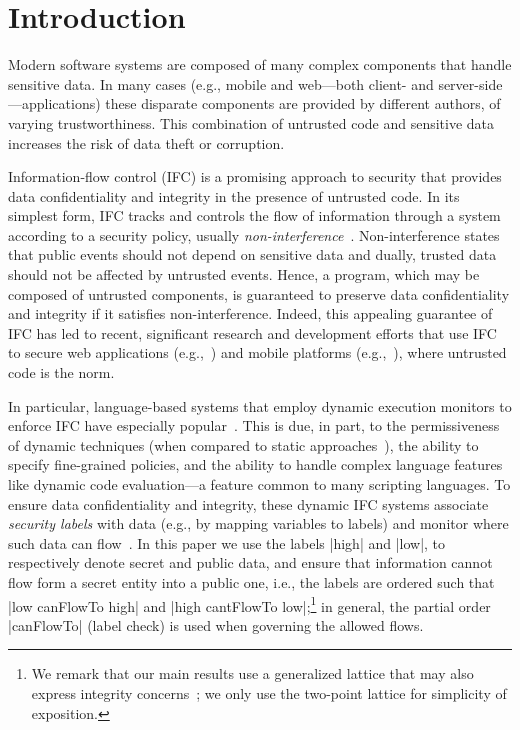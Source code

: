\section{Introduction}
\label{sec:intro}

Modern software systems are composed of many complex components that
handle sensitive data.
%
In many cases (e.g., mobile and web---both client- and
server-side---applications) these disparate components are provided
by different authors, of varying trustworthiness.
%
This combination of untrusted code and sensitive data 
increases the risk of data theft or corruption.

Information-flow control (IFC) is a promising approach to security
that provides data confidentiality and integrity in the presence of
untrusted code.
%
In its simplest form, IFC tracks and controls the flow of information
through a system according to a security policy, usually
\emph{non-interference}~\cite{Goguen:Meseguer:Noninterference}.
%
Non-interference states that public events should not depend on
sensitive data and dually, trusted data should not be affected by
untrusted events.
%
Hence, a program, which may be composed of untrusted components, is
guaranteed to preserve data confidentiality and integrity if it
satisfies non-interference.
%
Indeed, this appealing guarantee of IFC has led to recent, significant
research and development efforts that use IFC to secure web
applications (e.g.,~\cite{DeGroef:2012:FWB:2382196.2382275,
giffin:hails, yang:2013:towards, Hedin13}) and mobile platforms
(e.g.,~\cite{Enck:2010,android:esorics13}), where untrusted code is
the norm.

In particular, language-based systems that employ dynamic execution
monitors to enforce IFC have especially popular~\cite{Hedin2011}.
%
This is due, in part, to the permissiveness of dynamic techniques
(when compared to static approaches~\cite{Sabelfeld:Russo:PSI09}), the
ability to specify fine-grained policies, and the ability to handle
complex language features like dynamic code evaluation---a feature
common to many scripting languages.
%
To ensure data confidentiality and integrity, these dynamic IFC
systems associate \emph{security labels} with data (e.g., by mapping
variables to labels) and monitor where such data can
flow~\cite{myers:dlm, Stefan:2011}.  
%
In this paper we use the labels |high| and |low|, to respectively
denote secret and public data, and ensure that information cannot flow
form a secret entity into a public one, i.e., the labels are ordered
such that |low canFlowTo high| and |high cantFlowTo low|;\footnote{
  We remark that our main results use a generalized lattice that may
  also express integrity concerns~\cite{myers:dlm, Stefan:2011}; we
  only use the two-point lattice for simplicity of exposition.
}
%
in general, the partial order |canFlowTo| (label check) is used when
governing the allowed flows.
 
